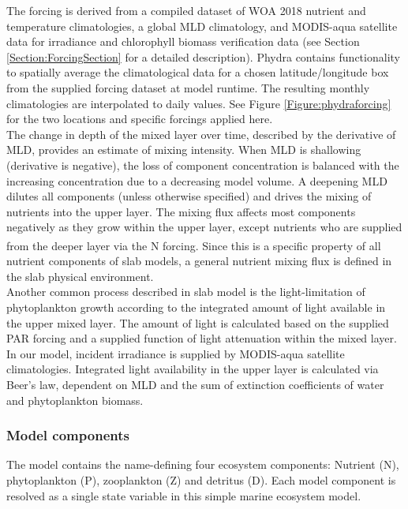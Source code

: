 \documentclass[template.tex]{subfiles}
\begin{document}
The forcing is derived from a compiled dataset of WOA 2018 nutrient and temperature climatologies, a global MLD climatology, and MODIS-aqua satellite data for irradiance and chlorophyll biomass verification data (see Section \ref{Section:ForcingSection} for a detailed description). Phydra contains functionality to spatially average the climatological data for a chosen latitude/longitude box from the supplied forcing dataset at model runtime. The resulting monthly climatologies are interpolated to daily values. See Figure \ref{Figure:phydraforcing} for the two locations and specific forcings applied here.\\

The change in depth of the mixed layer over time, described by the derivative of MLD, provides an estimate of mixing intensity. When MLD is shallowing (derivative is negative), the loss of component concentration is balanced with the increasing concentration due to a decreasing model volume. A deepening MLD dilutes all components (unless otherwise specified) and drives the mixing of nutrients into the upper layer.
The mixing flux affects most components negatively as they grow within the upper layer, except nutrients who are supplied from the deeper layer via the \unit{N^\emptyset} forcing. Since this is a specific property of all nutrient components of slab models, a general nutrient mixing flux is defined in the slab physical environment.  
\\

Another common process described in slab model is the light-limitation of phytoplankton growth according to the integrated amount of light available in the upper mixed layer. The amount of light is calculated based on the supplied PAR forcing and a supplied function of light attenuation within the mixed layer. In our model, incident irradiance is supplied by MODIS-aqua satellite climatologies. Integrated light availability in the upper layer is calculated via Beer's law, dependent on MLD and the sum of extinction coefficients of water and phytoplankton biomass. 




\subsubsection{Model components}
The model contains the name-defining four ecosystem components: Nutrient (N), phytoplankton (P), zooplankton (Z) and detritus (D). 
Each model component is resolved as a single state variable in this simple marine ecosystem model. 
\end{document}
